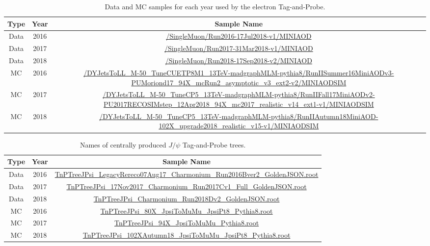 \begin{table}
\caption{Data and MC samples for each year used by the electron Tag-and-Probe.}
\label{tab:mutnpsamples}
\scriptsize
\begin{adjustwidth}{-0.5in}{-1in}
\begin{tabular}{cc|c}
\hline 
Type & Year & Sample Name \\ 
\hline 
\hline
Data & 2016 & \tiny \url{/SingleMuon/Run2016-17Jul2018-v1/MINIAOD}  \\  
Data & 2017 & \tiny \url{/SingleMuon/Run2017-31Mar2018-v1/MINIAOD} \\  
Data & 2018 & \tiny \url{/SingleMuon/Run2018-17Sep2018-v2/MINIAOD} \\ 
\hline 
MC & 2016 & \tiny \url{/DYJetsToLL_M-50_TuneCUETP8M1_13TeV-madgraphMLM-pythia8/RunIISummer16MiniAODv3-PUMoriond17_94X_mcRun2_asymptotic_v3_ext2-v2/MINIAODSIM} \\ 
MC & 2017 & \tiny \url{/DYJetsToLL_M-50_TuneCP5_13TeV-madgraphMLM-pythia8/RunIIFall17MiniAODv2-PU2017RECOSIMstep_12Apr2018_94X_mc2017_realistic_v14_ext1-v1/MINIAODSIM} \\ 
MC & 2018 & \tiny \url{/DYJetsToLL_M-50_TuneCP5_13TeV-madgraphMLM-pythia8/RunIIAutumn18MiniAOD-102X_upgrade2018_realistic_v15-v1/MINIAODSIM} \\ 
\hline
\end{tabular} 
\end{adjustwidth}
\end{table}

\begin{table}
\caption{Names of centrally produced $J/\psi$ Tag-and-Probe trees.}
\label{tab:jpsimutnpsamples}
\scriptsize
\centering
\begin{tabular}{cc|c}
\hline 
Type & Year & Sample Name \\ 
\hline 
\hline
Data & 2016 & \tiny \url{TnPTreeJPsi_LegacyRereco07Aug17_Charmonium_Run2016Bver2_GoldenJSON.root}  \\  
Data & 2017 & \tiny \url{TnPTreeJPsi_17Nov2017_Charmonium_Run2017Cv1_Full_GoldenJSON.root} \\  
Data & 2018 & \tiny \url{TnPTreeJPsi_Charmonium_Run2018Dv2_GoldenJSON.root} \\ 
\hline 
MC & 2016 & \tiny \url{TnPTreeJPsi_80X_JpsiToMuMu_JpsiPt8_Pythia8.root} \\ 
MC & 2017 & \tiny \url{TnPTreeJPsi_94X_JpsiToMuMu_Pythia8.root} \\ 
MC & 2018 & \tiny \url{TnPTreeJPsi_102XAutumn18_JpsiToMuMu_JpsiPt8_Pythia8.root} \\ 
\hline
\end{tabular} 
\end{table}

